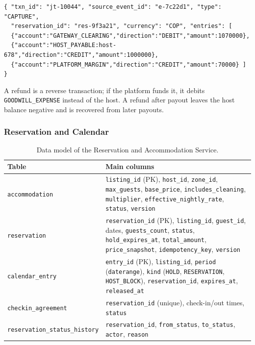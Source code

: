 {\footnotesize
\begin{verbatim}
{ "txn_id": "jt-10044", "source_event_id": "e-7c22d1", "type": "CAPTURE",
  "reservation_id": "res-9f3a21", "currency": "COP", "entries": [
  {"account":"GATEWAY_CLEARING","direction":"DEBIT","amount":1070000},
  {"account":"HOST_PAYABLE:host-678","direction":"CREDIT","amount":1000000},
  {"account":"PLATFORM_MARGIN","direction":"CREDIT","amount":70000} ] }
\end{verbatim}
}

A refund is a reverse transaction; if the platform funds it, it debits
\texttt{GOODWILL\_EXPENSE} instead of the host. A refund after payout leaves
the host balance negative and is recovered from later payouts.
\endgroup

\subsubsection{Reservation and Calendar}
\label{sec:res-model}

\begin{table}[!ht]
  \centering
  \small
  \begin{tabularx}{\textwidth}{@{}>{\raggedright\arraybackslash}p{4.2cm}>{\raggedright\arraybackslash}X@{}}
    \toprule
    \textbf{Table} & \textbf{Main columns} \\
    \midrule
    \texttt{accommodation} & \texttt{listing\_id} (PK), \texttt{host\_id}, \texttt{zone\_id}, \texttt{max\_guests}, \texttt{base\_price}, \texttt{includes\_cleaning}, \texttt{multiplier}, \texttt{effective\_nightly\_rate}, \texttt{status}, \texttt{version} \\
    \texttt{reservation} & \texttt{reservation\_id} (PK), \texttt{listing\_id}, \texttt{guest\_id}, dates, \texttt{guests\_count}, \texttt{status}, \texttt{hold\_expires\_at}, \texttt{total\_amount}, \texttt{price\_snapshot}, \texttt{idempotency\_key}, \texttt{version} \\
    \texttt{calendar\_entry} & \texttt{entry\_id} (PK), \texttt{listing\_id}, \texttt{period} (\texttt{daterange}), \texttt{kind} (\texttt{HOLD}, \texttt{RESERVATION}, \texttt{HOST\_BLOCK}), \texttt{reservation\_id}, \texttt{expires\_at}, \texttt{released\_at} \\
    \texttt{checkin\_agreement} & \texttt{reservation\_id} (unique), check-in/out times, \texttt{status} \\
    \texttt{reservation\_status\_history} & \texttt{reservation\_id}, \texttt{from\_status}, \texttt{to\_status}, \texttt{actor}, \texttt{reason} \\
    \bottomrule
  \end{tabularx}
  \caption{Data model of the Reservation and Accommodation Service.}
\end{table}

